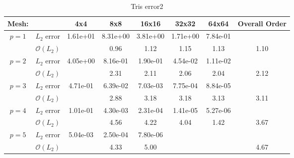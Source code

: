 \begin{table}[H]
\centering
\begin{tabular}{ c c c c c c c c} 
  
 Mesh: &   & 4x4 & 8x8 & 16x16 & 32x32 & 64x64 & Overall Order \\ 
 \hline 
 \multirow{2}{*}{$p = 1$} & $L_2$ error & 1.61e+01 & 8.31e+00 & 3.81e+00 & 1.71e+00 & 7.84e-01 &   \\ 
  
   & $\mathcal{O}(L_2)$ &   & 0.96 & 1.12 & 1.15 & 1.13 & 1.10 \\ 
 \hline 
 \multirow{2}{*}{$p = 2$} & $L_2$ error & 4.05e+00 & 8.16e-01 & 1.90e-01 & 4.54e-02 & 1.11e-02 &   \\ 
  
   & $\mathcal{O}(L_2)$ &   & 2.31 & 2.11 & 2.06 & 2.04 & 2.12 \\ 
 \hline 
 \multirow{2}{*}{$p = 3$} & $L_2$ error & 4.71e-01 & 6.39e-02 & 7.03e-03 & 7.75e-04 & 8.84e-05 &   \\ 
  
   & $\mathcal{O}(L_2)$ &   & 2.88 & 3.18 & 3.18 & 3.13 & 3.11 \\ 
 \hline 
 \multirow{2}{*}{$p = 4$} & $L_2$ error & 1.01e-01 & 4.30e-03 & 2.31e-04 & 1.41e-05 & 5.27e-06 &   \\ 
  
   & $\mathcal{O}(L_2)$ &   & 4.56 & 4.22 & 4.04 & 1.42 & 3.67 \\ 
 \hline 
 \multirow{2}{*}{$p = 5$} & $L_2$ error & 5.04e-03 & 2.50e-04 & 7.80e-06 &   &   &   \\ 
  
   & $\mathcal{O}(L_2)$ &   & 4.33 & 5.00 &   &   & 4.67 \\ 
 \hline 
 \end{tabular}
\caption{Tris error2} 
 \end{table}
